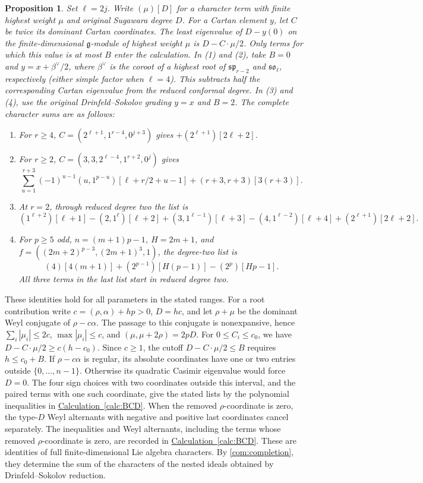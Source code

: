 \documentclass[11pt,a4paper]{amsart}
\numberwithin{equation}{section}
\newtheorem{proposition}[theorem]{Proposition}
\theoremstyle{definition}
\theoremstyle{remark}
\newcommand{\g}{\mathfrak g}
\newcommand{\spg}{\mathfrak{sp}}
\newcommand{\sog}{\mathfrak{so}}
\begin{document}
\begin{proposition}\label{seed:D-windows}
Set $\ell=2j$. Write $(\mu)[D]$ for a character term with finite
highest weight $\mu$ and original Sugawara degree $D$.
For a Cartan element $y$, let $C$ be twice its dominant Cartan
coordinates. The least eigenvalue of $D-y(0)$ on the finite-dimensional
$\g$-module of highest weight $\mu$ is $D-C\cdot\mu/2$.
Only terms for which this value is at most $B$ enter the calculation.
In (1) and (2), take $B=0$ and $y=x+\beta^\vee/2$, where
$\beta^\vee$ is the coroot of a highest root of $\spg_{r-2}$ and
$\sog_\ell$, respectively (either simple factor when $\ell=4$).
This subtracts half the corresponding Cartan eigenvalue from the
reduced conformal degree. In (3) and (4), use the original
Drinfeld--Sokolov grading $y=x$ and $B=2$.
The complete character sums are as follows:
\begin{enumerate}
\item For $r\ge4$, $C=(2^{\ell+1},1^{r-4},0^{j+3})$ gives
$+(2^{\ell+1})[2\ell+2]$.
\item For $r\ge2$, $C=(3,3,2^{\ell-4},1^{r+2},0^j)$ gives
$$
 \sum_{u=1}^{r+3}(-1)^{u-1}(u,1^{p-u})
       [\ell+r/2+u-1]+(r+3,r+3)[3(r+3)].
$$
\item At $r=2$, through reduced degree two the list is
$$
 (1^{\ell+2})[\ell+1]-(2,1^\ell)[\ell+2]
 +(3,1^{\ell-1})[\ell+3]-(4,1^{\ell-2})[\ell+4]
 +(2^{\ell+1})[2\ell+2].
$$
\item For $p\ge5$ odd, $n=(m+1)p-1$, $H=2m+1$, and
$f=((2m+2)^{p-3},(2m+1)^3,1)$, the degree-two list is
$$
 (4)[4(m+1)]+(2^{p-1})[H(p-1)]-(2^p)[Hp-1].
$$
All three terms in the last list start in reduced degree two.
\end{enumerate}
\end{proposition}
These identities hold for all parameters in the stated ranges.
For a root contribution write $c=(\rho,\alpha)+hp>0$, $D=hc$,
and let $\rho+\mu$ be the dominant Weyl conjugate of $\rho-c\alpha$.
The passage to this conjugate is nonexpansive, hence
$\sum_i|\mu_i|\le2c$, $\max|\mu_i|\le c$, and
$(\mu,\mu+2\rho)=2pD$.
For $0\le C_i\le c_0$, we have
$D-C\cdot\mu/2\ge c(h-c_0)$. Since $c\ge1$, the cutoff
$D-C\cdot\mu/2\le B$ requires $h\le c_0+B$.
If $\rho-c\alpha$ is regular, its absolute coordinates have one or
two entries outside $\{0,\ldots,n-1\}$. Otherwise its quadratic
Casimir eigenvalue would force $D=0$.
The four sign choices with two coordinates outside this interval,
and the paired terms with one such coordinate, give the stated lists
by the polynomial inequalities in
\hyperref[calc:BCD]{Calculation~\ref*{calc:BCD}}.
When the removed $\rho$-coordinate is zero, the type-$D$ Weyl
alternants with negative and positive last coordinates cancel separately. The inequalities and Weyl alternants, including the terms whose removed
$\rho$-coordinate is zero, are recorded in \hyperref[calc:BCD]{Calculation~\ref*{calc:BCD}}. These are identities of full finite-dimensional Lie algebra characters.
By \cref{com:completion}, they determine the sum of the characters of
the nested ideals obtained by Drinfeld--Sokolov reduction.
\end{document}
